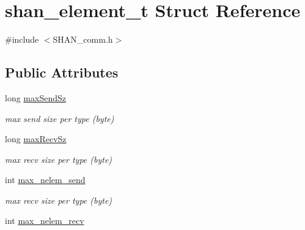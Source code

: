 \hypertarget{structshan__element__t}{}\section{shan\+\_\+element\+\_\+t Struct Reference}
\label{structshan__element__t}


{\ttfamily \#include $<$S\+H\+A\+N\+\_\+comm.\+h$>$}

\subsection*{Public Attributes}
\begin{DoxyCompactItemize}
\item 
long \hyperlink{structshan__element__t_a5ebc780b5d537ca7983bd7eb7ef8f772}{max\+Send\+Sz}\hypertarget{structshan__element__t_a5ebc780b5d537ca7983bd7eb7ef8f772}{}\label{structshan__element__t_a5ebc780b5d537ca7983bd7eb7ef8f772}

\begin{DoxyCompactList}\small\item\em max send size per type (byte) \end{DoxyCompactList}\item 
long \hyperlink{structshan__element__t_ac7b70205ec72204d189e7d4647db07c1}{max\+Recv\+Sz}\hypertarget{structshan__element__t_ac7b70205ec72204d189e7d4647db07c1}{}\label{structshan__element__t_ac7b70205ec72204d189e7d4647db07c1}

\begin{DoxyCompactList}\small\item\em max recv size per type (byte) \end{DoxyCompactList}\item 
int \hyperlink{structshan__element__t_a027fc8c9e8f89eab051d11ef8a3f5cde}{max\+\_\+nelem\+\_\+send}\hypertarget{structshan__element__t_a027fc8c9e8f89eab051d11ef8a3f5cde}{}\label{structshan__element__t_a027fc8c9e8f89eab051d11ef8a3f5cde}

\begin{DoxyCompactList}\small\item\em max recv size per type (byte) \end{DoxyCompactList}\item 
int \hyperlink{structshan__element__t_a63e06e116e876876ee9a91f901bc51aa}{max\+\_\+nelem\+\_\+recv}\hypertarget{structshan__element__t_a63e06e116e876876ee9a91f901bc51aa}{}\label{structshan__element__t_a63e06e116e876876ee9a91f901bc51aa}


\end{DoxyCompactItemize}
